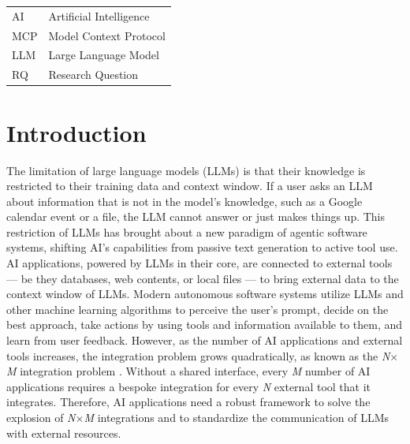 \documentclass[english, 12pt, a4paper, elec, utf8, a-2b, online]{aaltothesis}
\begin{document}
\begin{tabular}{ll}
AI          & Artificial Intelligence \\
MCP         & Model Context Protocol \\
LLM         & Large Language Model \\
RQ          & Research Question \\
\end{tabular}


\cleardoublepage

\section{Introduction}
\label{chap:intro}
\thispagestyle{empty}

The limitation of large language models (LLMs) is that their knowledge is restricted to their training data and context window.
If a user asks an LLM about information that is not in the model's knowledge, such as a Google calendar event or a file, the LLM cannot answer or just makes things up. 
This restriction of LLMs has brought about a new paradigm of agentic software systems, shifting AI's capabilities from passive text generation to active tool use.
AI applications, powered by LLMs in their core, are connected to external tools — be they databases, web contents, or local files — to bring external data to the context window of LLMs. 
Modern autonomous software systems utilize LLMs and other machine learning algorithms to perceive the user's prompt, decide on the best approach, take actions by using tools and information available to them, and learn from user feedback.
However, as the number of AI applications and external tools increases, the integration problem grows quadratically, as known as the \textit{N$\times$M} integration problem \cite{ray2025survey}. 
Without a shared interface, every \textit{M} number of AI applications requires a bespoke integration for every \textit{N} external tool that it integrates. 
Therefore, AI applications need a robust framework to solve the explosion of \textit{N$\times$M} integrations and to standardize the communication of LLMs with external resources.
\end{document}
